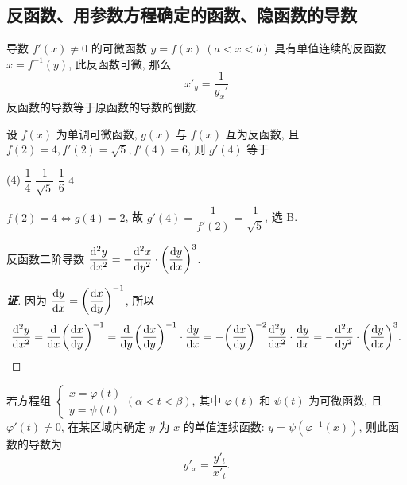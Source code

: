 \subsection{反函数、用参数方程确定的函数、隐函数的导数}

\begin{theorem}[反函数的导数]
    导数 $f'(x)\neq0$ 的可微函数 $y=f(x)~  (a<x<b)$ 具有单值连续的反函数 $x=f^{-1}(y)$,
    此反函数可微, 那么 $$x'_y=\dfrac{1}{y_x'}$$ 反函数的导数等于原函数的导数的倒数.
\end{theorem}

\begin{example}
    设 $f(x)$ 为单调可微函数, $g(x)$ 与 $f(x)$ 互为反函数, 且 $f(2)=4,f'(2)=\sqrt{5},f'(4)=6$, 则 $g'(4)$ 等于
    \begin{tasks}(4)
        \task $\dfrac{1}{4}$
        \task $\dfrac{1}{\sqrt{5}}$
        \task $\dfrac{1}{6}$
        \task $4$
    \end{tasks}
\end{example}
\begin{solution}
    $f(2)=4\Leftrightarrow g(4)=2$, 故 $g'(4)=\dfrac{1}{f'(2)}=\dfrac{1}{\sqrt{5}}$, 选 B.
\end{solution}

\begin{theorem}[反函数的二阶导数]
    反函数二阶导数 $\displaystyle \dv[2]{y}{x}=-\dv[2]{x}{y}\cdot\qty(\dv{y}{x})^{3}$.
\end{theorem}
\begin{proof}[{\songti \textbf{证}}]
    因为 $\displaystyle \dv{y}{x}=\qty(\dv{x}{y})^{-1}$, 所以 
    $$
    \dv[2]{y}{x}=\dv{x}\qty(\dv{x}{y})^{-1}=\dv{y}\qty(\dv{x}{y})^{-1}\cdot\dv{y}{x}=-\qty(\dv{x}{y})^{-2}\dv[2]{y}{x}\cdot\dv{y}{x}=-\dv[2]{x}{y}\cdot\qty(\dv{y}{x})^{3}.
    $$
\end{proof}

\begin{theorem}[用参数方程确定的函数的导数]
    若方程组
    $\begin{cases}
            x=\varphi(t) \\
            y=\psi (t)
        \end{cases}(\alpha<t<\beta)$, 其中 $\varphi(t)$ 和 $\psi(t)$ 为可微函数, 且 $\varphi'(t)\neq0$,
    在某区域内确定 $y$ 为 $x$ 的单值连续函数: $y=\psi\left(\varphi^{-1}(x)\right)$, 则此函数的导数为
    $$y'_x=\dfrac{y'_t}{x'_t}.$$
\end{theorem}

